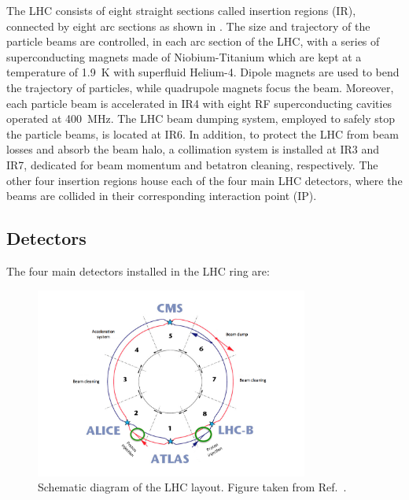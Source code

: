 The LHC consists of eight straight sections called insertion regions (IR), connected by eight arc sections as shown in . The size and trajectory of the particle beams are controlled, in each arc section of the LHC, with a series of superconducting magnets made of Niobium-Titanium which are kept at a temperature of \SI{1.9}{\K} with superfluid Helium-4. Dipole magnets are used to bend the trajectory of particles, while quadrupole magnets focus the beam. Moreover, each particle beam is accelerated in IR4 with eight RF superconducting cavities operated at \SI{400}{\MHz}. The LHC beam dumping system, employed to safely stop the particle beams, is located at IR6. In addition, to protect the LHC from beam losses and absorb the beam halo, a collimation system is installed at IR3 and IR7, dedicated for beam momentum and betatron cleaning, respectively. The other four insertion regions house each of the four main LHC detectors, where the beams are collided in their corresponding interaction point (IP).

\subsection{Detectors}\label{sec:Experiment_LHC_Detectors}

The four main detectors installed in the LHC ring are:

\begin{figure}[!htbp]
 \centering
 \includegraphics[width=0.8\textwidth]{Figures/Experiment/LHC/LHCLayout.png}
 \caption{Schematic diagram of the LHC layout. Figure taken from Ref.~\cite{LHCLayoutImage}.}
 \label{fig:LHCLayout}
\end{figure}

